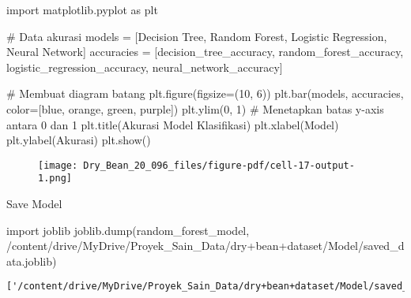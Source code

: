 \documentclass[
  letterpaper,
]{krantz}
\makeatletter
\newenvironment{Shaded}{\begin{snugshade}}{\end{snugshade}}
\newcommand{\CommentTok}[1]{\textcolor[rgb]{0.37,0.37,0.37}{#1}}
\newcommand{\DecValTok}[1]{\textcolor[rgb]{0.68,0.00,0.00}{#1}}
\newcommand{\ImportTok}[1]{\textcolor[rgb]{0.00,0.46,0.62}{#1}}
\newcommand{\NormalTok}[1]{\textcolor[rgb]{0.00,0.23,0.31}{#1}}
\newcommand{\OperatorTok}[1]{\textcolor[rgb]{0.37,0.37,0.37}{#1}}
\newcommand{\StringTok}[1]{\textcolor[rgb]{0.13,0.47,0.30}{#1}}
\newenvironment{kframe}{%
\medskip{}
\setlength{\fboxsep}{.8em}
 \def\at@end@of@kframe{}%
 \ifinner\ifhmode%
  \def\at@end@of@kframe{\end{minipage}}%
  \begin{minipage}{\columnwidth}%
 \fi\fi%
 \def\FrameCommand##1{\hskip\@totalleftmargin \hskip-\fboxsep
 \colorbox{shadecolor}{##1}\hskip-\fboxsep
     \hskip-\linewidth \hskip-\@totalleftmargin \hskip\columnwidth}%
 \MakeFramed {\advance\hsize-\width
   \@totalleftmargin\z@ \linewidth\hsize
   \@setminipage}}%
 {\par\unskip\endMakeFramed%
 \at@end@of@kframe}
\renewenvironment{Shaded}{\begin{kframe}}{\end{kframe}}
\makeatother
\begin{document}
\begin{Shaded}
\begin{Highlighting}[]
\ImportTok{import}\NormalTok{ matplotlib.pyplot }\ImportTok{as}\NormalTok{ plt}

\CommentTok{\# Data akurasi}
\NormalTok{models }\OperatorTok{=}\NormalTok{ [}\StringTok{\textquotesingle{}Decision Tree\textquotesingle{}}\NormalTok{, }\StringTok{\textquotesingle{}Random Forest\textquotesingle{}}\NormalTok{, }\StringTok{\textquotesingle{}Logistic Regression\textquotesingle{}}\NormalTok{, }\StringTok{\textquotesingle{}Neural Network\textquotesingle{}}\NormalTok{]}
\NormalTok{accuracies }\OperatorTok{=}\NormalTok{ [decision\_tree\_accuracy, random\_forest\_accuracy, logistic\_regression\_accuracy, neural\_network\_accuracy]}

\CommentTok{\# Membuat diagram batang}
\NormalTok{plt.figure(figsize}\OperatorTok{=}\NormalTok{(}\DecValTok{10}\NormalTok{, }\DecValTok{6}\NormalTok{))}
\NormalTok{plt.bar(models, accuracies, color}\OperatorTok{=}\NormalTok{[}\StringTok{\textquotesingle{}blue\textquotesingle{}}\NormalTok{, }\StringTok{\textquotesingle{}orange\textquotesingle{}}\NormalTok{, }\StringTok{\textquotesingle{}green\textquotesingle{}}\NormalTok{, }\StringTok{\textquotesingle{}purple\textquotesingle{}}\NormalTok{])}
\NormalTok{plt.ylim(}\DecValTok{0}\NormalTok{, }\DecValTok{1}\NormalTok{)  }\CommentTok{\# Menetapkan batas y{-}axis antara 0 dan 1}
\NormalTok{plt.title(}\StringTok{\textquotesingle{}Akurasi Model Klasifikasi\textquotesingle{}}\NormalTok{)}
\NormalTok{plt.xlabel(}\StringTok{\textquotesingle{}Model\textquotesingle{}}\NormalTok{)}
\NormalTok{plt.ylabel(}\StringTok{\textquotesingle{}Akurasi\textquotesingle{}}\NormalTok{)}
\NormalTok{plt.show()}
\end{Highlighting}
\end{Shaded}

\begin{figure}[H]

{\centering \texttt{[image: Dry\_Bean\_20\_096\_files/figure-pdf/cell-17-output-1.png]}

}

\end{figure}

Save Model

\begin{Shaded}
\begin{Highlighting}[]
\ImportTok{import}\NormalTok{ joblib}
\NormalTok{joblib.dump(random\_forest\_model, }\StringTok{\textquotesingle{}/content/drive/MyDrive/Proyek\_Sain\_Data/dry+bean+dataset/Model/saved\_data.joblib\textquotesingle{}}\NormalTok{)}
\end{Highlighting}
\end{Shaded}

\begin{verbatim}
['/content/drive/MyDrive/Proyek_Sain_Data/dry+bean+dataset/Model/saved_data.joblib']
\end{verbatim}



\backmatter
\printindex
\end{document}
